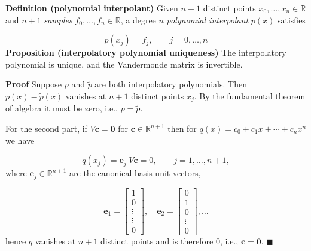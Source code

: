 \documentclass[12pt,a4paper]{article}
\def\bbR{ {\mathbb R} }
\begin{document}
\textbf{Definition (polynomial interpolant)} Given $n+1$ distinct points $x_0,\ensuremath{\ldots},x_n \ensuremath{\in} \ensuremath{\bbR}$  and $n+1$ \emph{samples} $f_0,\ensuremath{\ldots},f_n \ensuremath{\in} \ensuremath{\bbR}$, a degree $n$ \emph{polynomial interpolant} $p(x)$ satisfies

\[
p(x_j) = f_j, \qquad j = 0, \ldots, n
\]
\textbf{Proposition (interpolatory polynomial uniqueness)}  The interpolatory polynomial is unique, and the Vandermonde matrix is invertible.

\textbf{Proof} Suppose $p$ and $\tilde{p}$ are both interpolatory polynomials. Then $p(x) - \tilde{p}(x)$ vanishes at $n+1$ distinct points $x_j$. By the fundamental theorem of algebra it must be zero, i.e., $p = \tilde{p}$.

For the second part, if $V \mathbf{c} = \mathbf{0}$ for $\mathbf{c} \ensuremath{\in} \mathbb{R}^{n+1}$ then for $q(x) = c_0 + c_1 x + \ensuremath{\cdots} + c_{n} x^{n}$ we have

\[
q(x_j) = \mathbf{e}_j^\ensuremath{\top} V \mathbf{c} = 0, \qquad j = 1, \ldots, n+1,
\]
where $\mathbf{e}_j \in \mathbb{R}^{n+1}$ are the canonical basis unit vectors, 

\[
\mathbf{e}_1 = \begin{bmatrix}
1 \\
0 \\
\vdots \\
\vdots \\
0
\end{bmatrix}, \quad  \mathbf{e}_2 = \begin{bmatrix}
0 \\
1 \\
0 \\
\vdots \\
0
\end{bmatrix}, \ldots
\]
hence $q$ vanishes at $n+1$ distinct points and is therefore 0, i.e., $\mathbf{c} = \mathbf{0}$. $\blacksquare$
\end{document}
